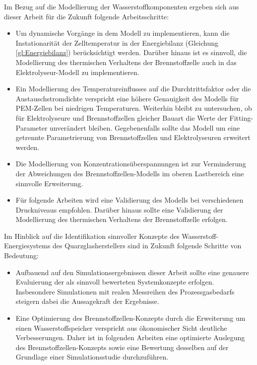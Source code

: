 Im Bezug auf die Modellierung der Wasserstoffkomponenten ergeben sich aus dieser Arbeit für die Zukunft folgende Arbeitsschritte:
\begin{itemize}
\item Um dynamische Vorgänge in dem Modell zu implementieren, kann die Instationarität der Zelltemperatur in der Energiebilanz (Gleichung \ref{gl:Energiebilanz}) berücksichtigt werden. Darüber hinaus ist es sinnvoll, die Modellierung des thermischen Verhaltens der Brennstoffzelle auch in das Elektrolyseur-Modell zu implementieren.
\item Ein Modellierung des Temperatureinflusses auf die Durchtrittsfaktor oder die Austauschstromdichte verspricht eine höhere Genauigkeit des Modells für PEM-Zellen bei niedrigen Temperaturen. Weiterhin bleibt zu untersuchen, ob für Elektrolyseure und Brennstoffzellen gleicher Bauart die Werte der Fitting-Parameter unverändert bleiben. Gegebenenfalls sollte das Modell um eine getrennte Parametrierung von Brennstoffzellen und Elektrolyseuren erweitert werden.
\item Die Modellierung von Konzentrationsüberspannungen ist zur Verminderung der Abweichungen des Brennstoffzellen-Modells im oberen Lastbereich eine sinnvolle Erweiterung.
\item Für folgende Arbeiten wird eine Validierung des Modells bei verschiedenen Druckniveaus empfohlen. Darüber hinaus sollte eine Validierung der Modellierung des thermischen Verhaltens der Brennstoffzelle erfolgen.\\
\end{itemize}
Im Hinblick auf die Identifikation sinnvoller Konzepte des Wasserstoff-Energiesystems des Quarzglasherstellers sind in Zukunft folgende Schritte von Bedeutung:
\begin{itemize}
\item Aufbauend auf den Simulationsergebnissen dieser Arbeit sollte eine genauere Evaluierung der als sinnvoll bewerteten Systemkonzepte erfolgen. Insbesondere Simulationen mit realen Messreihen des Prozessgasbedarfs steigern dabei die Aussagekraft der Ergebnisse.
\item Eine Optimierung des Brennstoffzellen-Konzepts durch die Erweiterung um einen Wasserstoffspeicher verspricht aus ökonomischer Sicht deutliche Verbesserungen. Daher ist in folgenden Arbeiten eine optimierte Auslegung des Brennstoffzellen-Konzepts sowie eine Bewertung desselben auf der Grundlage einer Simulationsstudie durchzuführen.
\end{itemize}